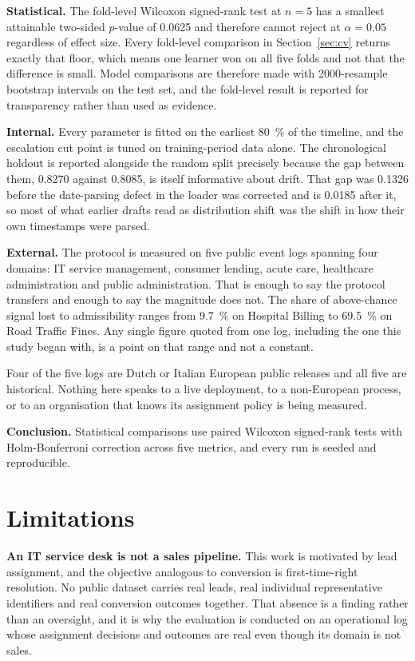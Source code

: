 \textbf{Statistical.} The fold-level Wilcoxon signed-rank test at $n=5$ has a smallest
attainable two-sided $p$-value of \num{0.0625} and therefore cannot reject at
$\alpha=\num{0.05}$ regardless of effect size. Every fold-level comparison in
Section~\ref{sec:cv} returns exactly that floor, which means one learner won on all five folds
and not that the difference is small. Model comparisons are therefore made with 2000-resample
bootstrap intervals on the test set, and the fold-level result is reported for transparency
rather than used as evidence.

\textbf{Internal.} Every parameter is fitted on the earliest \SI{80}{\percent} of the timeline,
and the escalation cut point is tuned on training-period data alone. The chronological holdout
is reported alongside the random split precisely because the gap between them, \num{0.8270}
against \num{0.8085}, is itself informative about drift. That gap was \num{0.1326} before the date-parsing defect in the loader was corrected and is \num{0.0185} after it, so most of what earlier drafts read as distribution shift was the shift in how their own timestamps were parsed.

\textbf{External.} The protocol is measured on five public event logs spanning four domains:
IT service management, consumer lending, acute care, healthcare administration and public
administration. That is enough to say the protocol transfers and enough to say the magnitude
does not. The share of above-chance signal lost to admissibility ranges from \SI{9.7}{\percent}
on Hospital Billing to \SI{69.5}{\percent} on Road Traffic Fines. Any single figure quoted from
one log, including the one this study began with, is a point on that range and not a constant.

Four of the five logs are Dutch or Italian European public releases and all five are historical.
Nothing here speaks to a live deployment, to a non-European process, or to an organisation that
knows its assignment policy is being measured.

\textbf{Conclusion.} Statistical comparisons use paired Wilcoxon signed-rank tests with
Holm-Bonferroni correction across five metrics, and every run is seeded and reproducible.

\section{Limitations}

\textbf{An IT service desk is not a sales pipeline.} This work is motivated by lead
assignment, and the objective analogous to conversion is first-time-right resolution. No
public dataset carries real leads, real individual representative identifiers and real
conversion outcomes together. That absence is a finding rather than an oversight, and it is
why the evaluation is conducted on an operational log whose assignment decisions and outcomes
are real even though its domain is not sales.

